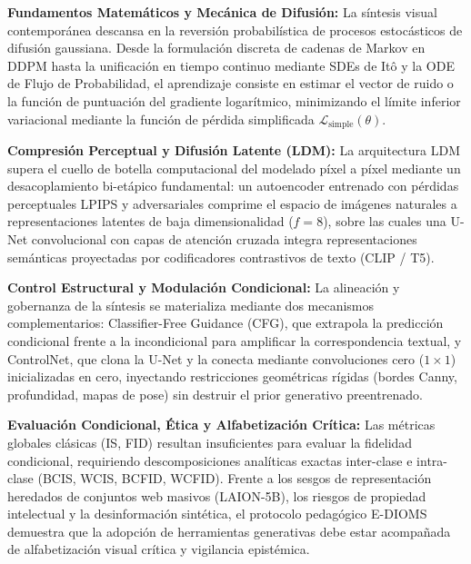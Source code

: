 \begin{resumenlist}[topsep=0.08cm, itemsep=0.08cm, parsep=0pt]
    \item \textbf{Fundamentos Matemáticos y Mecánica de Difusión:} La síntesis visual contemporánea descansa en la reversión probabilística de procesos estocásticos de difusión gaussiana. Desde la formulación discreta de cadenas de Markov en DDPM hasta la unificación en tiempo continuo mediante SDEs de Itô y la ODE de Flujo de Probabilidad, el aprendizaje consiste en estimar el vector de ruido o la función de puntuación del gradiente logarítmico, minimizando el límite inferior variacional mediante la función de pérdida simplificada $\mathcal{L}_{\mathrm{simple}}(\theta)$.
    \item \textbf{Compresión Perceptual y Difusión Latente (LDM):} La arquitectura LDM supera el cuello de botella computacional del modelado píxel a píxel mediante un desacoplamiento bi-etápico fundamental: un autoencoder entrenado con pérdidas perceptuales LPIPS y adversariales comprime el espacio de imágenes naturales a representaciones latentes de baja dimensionalidad ($f=8$), sobre las cuales una U-Net convolucional con capas de atención cruzada integra representaciones semánticas proyectadas por codificadores contrastivos de texto (CLIP / T5).
    \item \textbf{Control Estructural y Modulación Condicional:} La alineación y gobernanza de la síntesis se materializa mediante dos mecanismos complementarios: Classifier-Free Guidance (CFG), que extrapola la predicción condicional frente a la incondicional para amplificar la correspondencia textual, y ControlNet, que clona la U-Net y la conecta mediante convoluciones cero ($1 \times 1$) inicializadas en cero, inyectando restricciones geométricas rígidas (bordes Canny, profundidad, mapas de pose) sin destruir el prior generativo preentrenado.
    \item \textbf{Evaluación Condicional, Ética y Alfabetización Crítica:} Las métricas globales clásicas (IS, FID) resultan insuficientes para evaluar la fidelidad condicional, requiriendo descomposiciones analíticas exactas inter-clase e intra-clase (BCIS, WCIS, BCFID, WCFID). Frente a los sesgos de representación heredados de conjuntos web masivos (LAION-5B), los riesgos de propiedad intelectual y la desinformación sintética, el protocolo pedagógico E-DIOMS demuestra que la adopción de herramientas generativas debe estar acompañada de alfabetización visual crítica y vigilancia epistémica.
\end{resumenlist}

